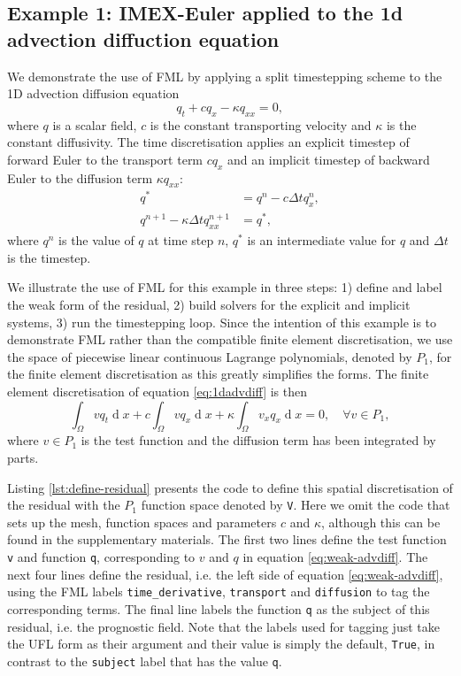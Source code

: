 \documentclass[journal abbreviation, manuscript]{copernicus}
\DeclareMathOperator{\diff}{d}
\begin{document}
\subsection{Example 1: IMEX-Euler applied to the 1d advection diffuction equation}

We demonstrate the use of FML by applying a split timestepping scheme
to the 1D advection diffusion equation
\begin{equation}\label{eq:1dadvdiff}
  q_t + cq_x - \kappa q_{xx} = 0,
\end{equation}
where $q$ is a scalar field, $c$ is the constant transporting velocity
and $\kappa$ is the constant diffusivity. The time discretisation
applies an explicit timestep of forward Euler to the transport term
$cq_x$ and an implicit timestep of backward Euler to the diffusion
term $\kappa q_{xx}$:
\begin{align}
  q^* &= q^n - c \Delta t q_x^n, \label{eq:explicit-advdiff} \\
  q^{n+1} - \kappa \Delta t q_{xx}^{n+1} &= q^*, \label{eq:implicit-advdiff}
\end{align}
where $q^n$ is the value of $q$ at time step $n$, $q^*$ is an
intermediate value for $q$ and $\Delta t$ is the timestep.

We illustrate the use of FML for this example in three steps: 1)
define and label the weak form of the residual, 2) build solvers for
the explicit and implicit systems, 3) run the timestepping loop. Since
the intention of this example is to demonstrate FML rather than the
compatible finite element discretisation, we use the space of piecewise
linear continuous Lagrange polynomials, denoted by $P_1$, for the
finite element discretisation as this greatly simplifies the
forms. The finite element discretisation of equation
\ref{eq:1dadvdiff} is then
\begin{equation}\label{eq:weak-advdiff}
  \int_\Omega vq_t \diff x + c \int_\Omega v q_x \diff x + \kappa \int_\Omega v_x q_x \diff x = 0, \quad \forall v \in P_1,
\end{equation}
where $v\in P_1$ is the test function and the diffusion term has been
integrated by parts.

Listing \ref{lst:define-residual} presents the code to define this
spatial discretisation of the residual with the $P_1$ function space
denoted by \texttt{V}. Here we omit the code that sets up the mesh,
function spaces and parameters $c$ and $\kappa$, although this can be
found in the supplementary materials. The first two lines define the
test function \texttt{v} and function \texttt{q}, corresponding to $v$
and $q$ in equation \ref{eq:weak-advdiff}. The next four lines define
the residual, i.e. the left side of equation \ref{eq:weak-advdiff},
using the FML labels \texttt{time\_derivative}, \texttt{transport} and
\texttt{diffusion} to tag the corresponding terms. The final line
labels the function \texttt{q} as the subject of this residual,
i.e. the prognostic field. Note that the labels used for tagging just
take the UFL form as their argument and their value is simply the
default, \texttt{True}, in contrast to the \texttt{subject} label that
has the value \texttt{q}.
\end{document}
